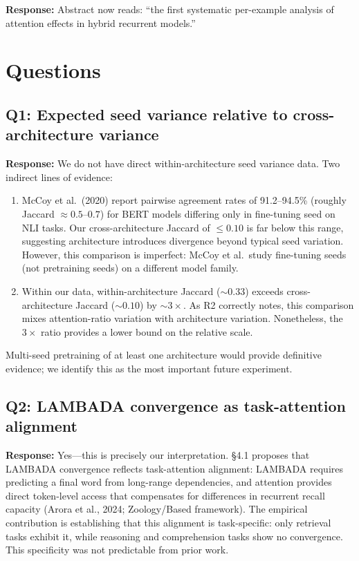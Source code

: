 \documentclass[11pt]{article}
\newcommand{\response}[1]{\textcolor{responsecolor}{\textbf{Response:} #1}}
\begin{document}
\response{Abstract now reads: ``the first systematic per-example analysis of attention effects in hybrid recurrent models.''}

\section*{Questions}

\subsection*{Q1: Expected seed variance relative to cross-architecture variance}

\response{We do not have direct within-architecture seed variance data. Two indirect lines of evidence:}
\begin{enumerate}[leftmargin=2em]
\item McCoy et al.\ (2020) report pairwise agreement rates of 91.2--94.5\% (roughly Jaccard $\approx 0.5$--$0.7$) for BERT models differing only in fine-tuning seed on NLI tasks. Our cross-architecture Jaccard of $\leq 0.10$ is far below this range, suggesting architecture introduces divergence beyond typical seed variation. However, this comparison is imperfect: McCoy et al.\ study fine-tuning seeds (not pretraining seeds) on a different model family.
\item Within our data, within-architecture Jaccard (${\sim}0.33$) exceeds cross-architecture Jaccard (${\sim}0.10$) by ${\sim}3\times$. As R2 correctly notes, this comparison mixes attention-ratio variation with architecture variation. Nonetheless, the $3\times$ ratio provides a lower bound on the relative scale.
\end{enumerate}
Multi-seed pretraining of at least one architecture would provide definitive evidence; we identify this as the most important future experiment.

\subsection*{Q2: LAMBADA convergence as task-attention alignment}

\response{Yes---this is precisely our interpretation. \S4.1 proposes that LAMBADA convergence reflects task-attention alignment: LAMBADA requires predicting a final word from long-range dependencies, and attention provides direct token-level access that compensates for differences in recurrent recall capacity (Arora et al., 2024; Zoology/Based framework). The empirical contribution is establishing that this alignment is task-specific: only retrieval tasks exhibit it, while reasoning and comprehension tasks show no convergence. This specificity was not predictable from prior work.}
\end{document}
